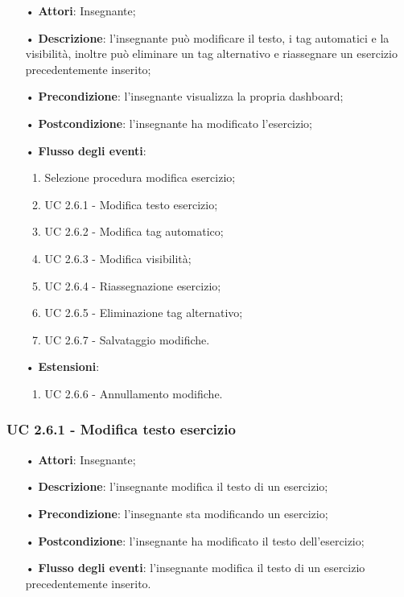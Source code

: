\begin{itemize}
	\item[•] \textbf{Attori}: Insegnante;
	\item[•] \textbf{Descrizione}: l'insegnante può modificare il testo, i tag automatici e la visibilità, inoltre può eliminare un tag alternativo e riassegnare un esercizio precedentemente inserito;
	\item[•] \textbf{Precondizione}:  l'insegnante visualizza la propria dashboard;
	\item[•] \textbf{Postcondizione}: l'insegnante ha modificato l'esercizio;
	\item[•] \textbf{Flusso degli eventi}:
	\begin{enumerate}
		\item Selezione procedura modifica esercizio;
		\item UC 2.6.1 - Modifica testo esercizio;
		\item UC 2.6.2 - Modifica tag automatico;
		\item UC 2.6.3 - Modifica visibilità;
		\item UC 2.6.4 - Riassegnazione esercizio;
		\item UC 2.6.5 - Eliminazione tag alternativo;
		\item UC 2.6.7 - Salvataggio modifiche.
	\end{enumerate}
	\item[•] \textbf{Estensioni}:	
	\begin{enumerate}
		\item UC 2.6.6 - Annullamento modifiche.
	\end{enumerate}
\end{itemize}


\subsubsection{UC 2.6.1 - Modifica testo esercizio}
\begin{itemize}
	\item[•] \textbf{Attori}: Insegnante;
	\item[•] \textbf{Descrizione}: l'insegnante modifica il testo di un esercizio;
	\item[•] \textbf{Precondizione}: l'insegnante sta modificando un esercizio;
	\item[•] \textbf{Postcondizione}: l'insegnante ha modificato il testo dell'esercizio;
	\item[•] \textbf{Flusso degli eventi}: l'insegnante modifica il testo di un esercizio precedentemente inserito.
\end{itemize}



